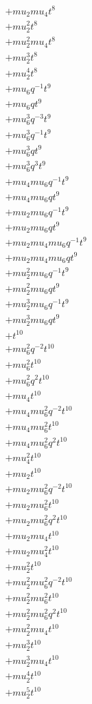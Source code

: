 \begin{align*}
  + mu_2 mu_4 t^{8} \\
  + mu_2^{2} t^{8} \\
  + mu_2^{2} mu_4 t^{8} \\
  + mu_2^{3} t^{8} \\
  + mu_2^{4} t^{8} \\
  + mu_6 q^{-1} t^{9} \\
  + mu_6 q t^{9} \\
  + mu_6^{3} q^{-3} t^{9} \\
  + mu_6^{3} q^{-1} t^{9} \\
  + mu_6^{3} q t^{9} \\
  + mu_6^{3} q^{3} t^{9} \\
  + mu_4 mu_6 q^{-1} t^{9} \\
  + mu_4 mu_6 q t^{9} \\
  + mu_2 mu_6 q^{-1} t^{9} \\
  + mu_2 mu_6 q t^{9} \\
  + mu_2 mu_4 mu_6 q^{-1} t^{9} \\
  + mu_2 mu_4 mu_6 q t^{9} \\
  + mu_2^{2} mu_6 q^{-1} t^{9} \\
  + mu_2^{2} mu_6 q t^{9} \\
  + mu_2^{3} mu_6 q^{-1} t^{9} \\
  + mu_2^{3} mu_6 q t^{9} \\
  + t^{10} \\
  + mu_6^{2} q^{-2} t^{10} \\
  + mu_6^{2} t^{10} \\
  + mu_6^{2} q^{2} t^{10} \\
  + mu_4 t^{10} \\
  + mu_4 mu_6^{2} q^{-2} t^{10} \\
  + mu_4 mu_6^{2} t^{10} \\
  + mu_4 mu_6^{2} q^{2} t^{10} \\
  + mu_4^{2} t^{10} \\
  + mu_2 t^{10} \\
  + mu_2 mu_6^{2} q^{-2} t^{10} \\
  + mu_2 mu_6^{2} t^{10} \\
  + mu_2 mu_6^{2} q^{2} t^{10} \\
  + mu_2 mu_4 t^{10} \\
  + mu_2 mu_4^{2} t^{10} \\
  + mu_2^{2} t^{10} \\
  + mu_2^{2} mu_6^{2} q^{-2} t^{10} \\
  + mu_2^{2} mu_6^{2} t^{10} \\
  + mu_2^{2} mu_6^{2} q^{2} t^{10} \\
  + mu_2^{2} mu_4 t^{10} \\
  + mu_2^{3} t^{10} \\
  + mu_2^{3} mu_4 t^{10} \\
  + mu_2^{4} t^{10} \\
  + mu_2^{5} t^{10}
\end{align*}
